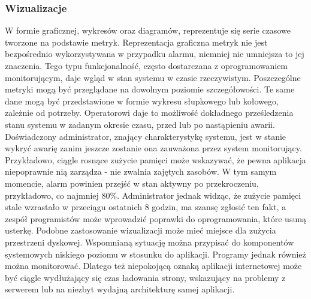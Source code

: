         \subsubsection{Wizualizacje}
        W formie graficznej, wykresów oraz diagramów, reprezentuje się serie czasowe tworzone na podstawie metryk. 
        Reprezentacja graficzna metryk nie jest bezpośrednio wykorzystywana w przypadku alarmu,
        niemniej nie umniejsza to jej znaczenia. Tego typu funkcjonalność, często dostarczana z oprogramowaniem
        monitorującym, daje wgląd w stan systemu w czasie rzeczywistym. Poszczególne metryki mogą być
        przeglądane na dowolnym poziomie szczegółowości. Te same dane mogą być przedstawione w formie
        wykresu słupkowego lub kołowego, zależnie od potrzeby. Operatorowi daje
        to możliwość dokładnego prześledzenia stanu systemu w zadanym okresie czasu, przed lub po
        nastąpieniu awarii. Doświadczony administrator, znający charakterystykę systemu, jest w stanie
        wykryć awarię zanim jeszcze zostanie ona zauważona przez system monitorujący. Przykładowo, ciągle
        rosnące zużycie pamięci może wskazywać, że pewna aplikacja niepoprawnie nią zarządza -
        nie zwalnia zajętych zasobów. W tym samym momencie, alarm powinien przejść
        w stan aktywny po przekroczeniu, przykładowo, co najmniej 80\%. Administrator jednak widząc, że zużycie pamięci
        stale wzrastało w przeciągu ostatnich 8 godzin, ma szansę zgłosić ten fakt, a zespół programistów
        może wprowadzić poprawki do oprogramowania, które usuną usterkę. Podobne zastosowanie wizualizacji może mieć miejsce dla zużycia przestrzeni dyskowej. Wspomnianą sytuację można przypisać do komponentów
        systemowych niskiego poziomu w stosunku do aplikacji. Programy jednak również można monitorować.
        Dlatego też niepokojącą oznaką aplikacji internetowej może być ciągle wydłużający się czas 
        ładowania strony, wskazujący na problemy z serwerem lub na niezbyt wydajną architekturę samej aplikacji. 